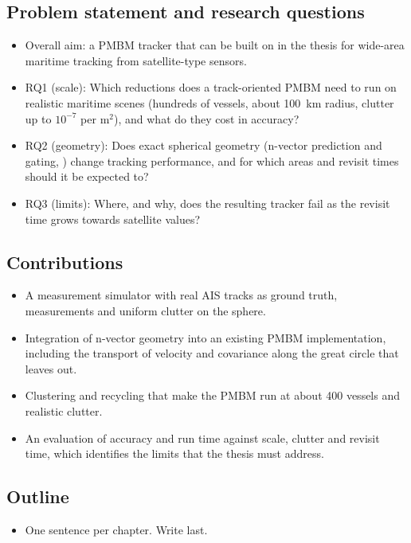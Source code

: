 \subsection{Problem statement and research questions}
\label{sec:rq}
\begin{itemize}
    \item Overall aim: a PMBM tracker that can be built on in the thesis for wide-area maritime tracking from satellite-type sensors.
    \item RQ1 (scale): Which reductions does a track-oriented PMBM need to run on realistic maritime scenes (hundreds of vessels, about 100~km radius, clutter up to $10^{-7}$ per m$^2$), and what do they cost in accuracy?
    \item RQ2 (geometry): Does exact spherical geometry (n-vector prediction and gating, \cite{b_gade_2024}) change tracking performance, and for which areas and revisit times should it be expected to?
    \item RQ3 (limits): Where, and why, does the resulting tracker fail as the revisit time grows towards satellite values?
\end{itemize}

\subsection{Contributions}
\label{sec:contributions}
\begin{itemize}
    \item A measurement simulator with real AIS tracks as ground truth, measurements and uniform clutter on the sphere.
    \item Integration of n-vector geometry into an existing PMBM implementation, including the transport of velocity and covariance along the great circle that \cite{b_gade_2024} leaves out.
    \item Clustering and recycling that make the PMBM run at about 400 vessels and realistic clutter.
    \item An evaluation of accuracy and run time against scale, clutter and revisit time, which identifies the limits that the thesis must address.
\end{itemize}

\subsection{Outline}
\label{sec:outline}
\begin{itemize}
    \item One sentence per chapter. Write last.
\end{itemize}
